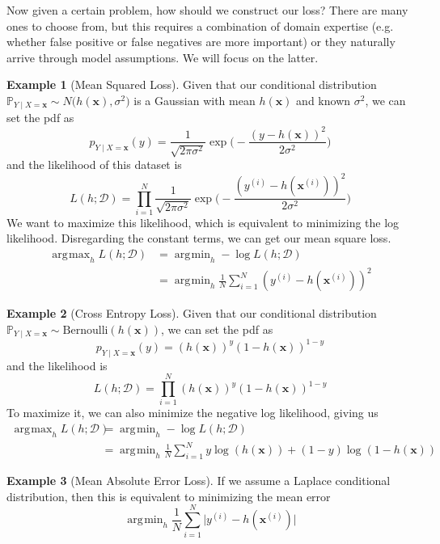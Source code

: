 \documentclass{article}
\DeclareMathOperator*{\argmin}{\arg\!\min}
\DeclareMathOperator*{\argmax}{\arg\!\max}
\theoremstyle{definition}
\newtheorem{example}{Example}[section]
\theoremstyle{remark}
\theoremstyle{definition}
\begin{document}
Now given a certain problem, how should we construct our loss? There are many ones to choose from, but this requires a combination of domain expertise (e.g. whether false positive or false negatives are more important) or they naturally arrive through model assumptions. We will focus on the latter. 

\begin{example}[Mean Squared Loss]
Given that our conditional distribution $\mathbb{P}_{Y \mid X = \mathbf{x}} \sim N\big( h(\mathbf{x}), \sigma^2)$ is a Gaussian with mean $h(\mathbf{x})$ and known $\sigma^2$, we can set the pdf as 
\[p_{Y \mid X = \mathbf{x}} (y) = \frac{1}{\sqrt{2\pi \sigma^2}} \exp \bigg( -\frac{ (y - h(\mathbf{x}))^2}{2 \sigma^2} \bigg) \]
and the likelihood of this dataset is 
\[L(h; \mathcal{D}) = \prod_{i=1}^N \frac{1}{\sqrt{2\pi \sigma^2}} \exp \bigg( -\frac{ (y^{(i)} - h(\mathbf{x}^{(i)}))^2}{2 \sigma^2} \bigg)\]
We want to maximize this likelihood, which is equivalent to minimizing the log likelihood. Disregarding the constant terms, we can get our mean square loss. 
\begin{align*}
    \argmax_h L(h; \mathcal{D}) & = \argmin_h -\log L(h; \mathcal{D}) \\
    & = \argmin_h \frac{1}{N} \sum_{i=1}^N (y^{(i)} - h( \mathbf{x}^{(i)}))^2 
\end{align*}
\end{example}

\begin{example}[Cross Entropy Loss]
Given that our conditional distribution $\mathbb{P}_{Y \mid X = \mathbf{x}} \sim \mathrm{Bernoulli}(h(\mathbf{x}))$, we can set the pdf as 
\[p_{Y \mid X = \mathbf{x}} (y) = (h(\mathbf{x}))^y (1 - h(\mathbf{x}))^{1 - y}\]
and the likelihood is 
\[L(h; \mathcal{D}) = \prod_{i=1}^N (h(\mathbf{x}))^y (1 - h(\mathbf{x}))^{1 - y}\]
To maximize it, we can also minimize the negative log likelihood, giving us 
\begin{align*}
    \argmax_h L(h; \mathcal{D}) & = \argmin_h -\log L(h; \mathcal{D}) \\
    & = \argmin_h \frac{1}{N} \sum_{i=1}^N y \log (h(\mathbf{x})) + (1 - y) \log (1 - h(\mathbf{x})) 
\end{align*}
\end{example}

\begin{example}[Mean Absolute Error Loss]
If we assume a Laplace conditional distribution, then this is equivalent to minimizing the mean error 
\[\argmin_h \frac{1}{N} \sum_{i=1}^N \big| y^{(i)} - h(\mathbf{x}^{(i)}) \big| \]
\end{example}
\end{document}

